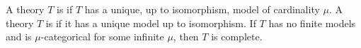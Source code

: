 A theory $T$ is  if $T$ has a unique, up to isomorphism, model of cardinality $\mu$. A theory $T$ is  if it has a unique model up to isomorphism. If $T$ has no finite models and is $\mu$-categorical for some infinite $\mu$, then $T$ is complete.
